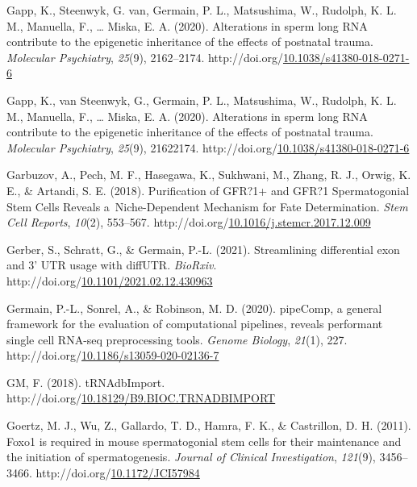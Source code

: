 \documentclass[12pt,twoside]{reedthesis}
\newlength{\cslhangindent}
\newenvironment{CSLReferences}[2] %
 {%
  \setlength{\parindent}{0pt}
  \ifodd #1 \everypar{\setlength{\hangindent}{\cslhangindent}}\ignorespaces\fi
  \ifnum #2 > 0
  \setlength{\parskip}{#2\baselineskip}
  \fi
 }%
 {}
\begin{document}
\begin{CSLReferences}{1}{0}
\leavevmode{}%
Gapp, K., Steenwyk, G. van, Germain, P. L., Matsushima, W., Rudolph, K. L. M., Manuella, F., \ldots{} Miska, E. A. (2020). Alterations in sperm long {RNA} contribute to the epigenetic inheritance of the effects of postnatal trauma. \emph{Molecular Psychiatry}, \emph{25}(9), 2162--2174. http://doi.org/\href{https://doi.org/10.1038/s41380-018-0271-6}{10.1038/s41380-018-0271-6}

\leavevmode{}%
Gapp, K., van Steenwyk, G., Germain, P. L., Matsushima, W., Rudolph, K. L. M., Manuella, F., \ldots{} Miska, E. A. (2020). Alterations in sperm long RNA contribute to the epigenetic inheritance of the effects of postnatal trauma. \emph{Molecular Psychiatry}, \emph{25}(9), 21622174. http://doi.org/\href{https://doi.org/10.1038/s41380-018-0271-6}{10.1038/s41380-018-0271-6}

\leavevmode{}%
Garbuzov, A., Pech, M. F., Hasegawa, K., Sukhwani, M., Zhang, R. J., Orwig, K. E., \& Artandi, S. E. (2018). Purification of GFR?1+ and GFR?1{\textendash} Spermatogonial Stem Cells Reveals a~Niche-Dependent Mechanism for Fate Determination. \emph{Stem Cell Reports}, \emph{10}(2), 553--567. http://doi.org/\href{https://doi.org/10.1016/j.stemcr.2017.12.009}{10.1016/j.stemcr.2017.12.009}

\leavevmode{}%
Gerber, S., Schratt, G., \& Germain, P.-L. (2021). Streamlining differential exon and 3' UTR usage with diffUTR. \emph{BioRxiv}. http://doi.org/\href{https://doi.org/10.1101/2021.02.12.430963}{10.1101/2021.02.12.430963}

\leavevmode{}%
Germain, P.-L., Sonrel, A., \& Robinson, M. D. (2020). pipeComp, a general framework for the evaluation of computational pipelines, reveals performant single cell RNA-seq preprocessing tools. \emph{Genome Biology}, \emph{21}(1), 227. http://doi.org/\href{https://doi.org/10.1186/s13059-020-02136-7}{10.1186/s13059-020-02136-7}

\leavevmode{}%
GM, F. (2018). tRNAdbImport. http://doi.org/\href{https://doi.org/10.18129/B9.BIOC.TRNADBIMPORT}{10.18129/B9.BIOC.TRNADBIMPORT}

\leavevmode{}%
Goertz, M. J., Wu, Z., Gallardo, T. D., Hamra, F. K., \& Castrillon, D. H. (2011). Foxo1 is required in mouse spermatogonial stem cells for their maintenance and the initiation of spermatogenesis. \emph{Journal of Clinical Investigation}, \emph{121}(9), 3456--3466. http://doi.org/\href{https://doi.org/10.1172/JCI57984}{10.1172/JCI57984}


\end{CSLReferences}
\end{document}
